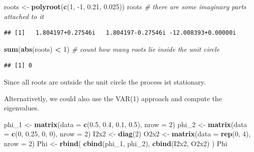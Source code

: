 \documentclass[12pt,a4paper]{article}
\newenvironment{Shaded}{\begin{snugshade}}{\end{snugshade}}
\newcommand{\CommentTok}[1]{\textcolor[rgb]{0.56,0.35,0.01}{\textit{#1}}}
\newcommand{\DataTypeTok}[1]{\textcolor[rgb]{0.13,0.29,0.53}{#1}}
\newcommand{\DecValTok}[1]{\textcolor[rgb]{0.00,0.00,0.81}{#1}}
\newcommand{\FloatTok}[1]{\textcolor[rgb]{0.00,0.00,0.81}{#1}}
\newcommand{\KeywordTok}[1]{\textcolor[rgb]{0.13,0.29,0.53}{\textbf{#1}}}
\newcommand{\NormalTok}[1]{#1}
\newcommand{\OperatorTok}[1]{\textcolor[rgb]{0.81,0.36,0.00}{\textbf{#1}}}
\newcommand{\StringTok}[1]{\textcolor[rgb]{0.31,0.60,0.02}{#1}}
\begin{document}
\begin{Shaded}
\begin{Highlighting}[]
\NormalTok{roots <-}\StringTok{ }\KeywordTok{polyroot}\NormalTok{(}\KeywordTok{c}\NormalTok{(}\DecValTok{1}\NormalTok{, }\DecValTok{-1}\NormalTok{, }\FloatTok{0.21}\NormalTok{, }\FloatTok{0.025}\NormalTok{))}
\NormalTok{roots }\CommentTok{# there are some imaginary parts attached to it}
\end{Highlighting}
\end{Shaded}

\begin{verbatim}
## [1]   1.804197+0.27546i   1.804197-0.27546i -12.008393+0.00000i
\end{verbatim}

\begin{Shaded}
\begin{Highlighting}[]
\KeywordTok{sum}\NormalTok{(}\KeywordTok{abs}\NormalTok{(roots) }\OperatorTok{<}\StringTok{ }\DecValTok{1}\NormalTok{) }\CommentTok{# count how many roots lie inside the unit circle}
\end{Highlighting}
\end{Shaded}

\begin{verbatim}
## [1] 0
\end{verbatim}

Since all roots are outside the unit circle the process ist stationary.

Alternativetly, we could also use the VAR(1) approach and compute the
eigenvalues.

\begin{Shaded}
\begin{Highlighting}[]
\NormalTok{phi_}\DecValTok{1}\NormalTok{ <-}\StringTok{ }\KeywordTok{matrix}\NormalTok{(}\DataTypeTok{data =} \KeywordTok{c}\NormalTok{(}\FloatTok{0.5}\NormalTok{, }\FloatTok{0.4}\NormalTok{, }\FloatTok{0.1}\NormalTok{, }\FloatTok{0.5}\NormalTok{), }\DataTypeTok{nrow =} \DecValTok{2}\NormalTok{)}
\NormalTok{phi_}\DecValTok{2}\NormalTok{ <-}\StringTok{ }\KeywordTok{matrix}\NormalTok{(}\DataTypeTok{data =} \KeywordTok{c}\NormalTok{(}\DecValTok{0}\NormalTok{, }\FloatTok{0.25}\NormalTok{, }\DecValTok{0}\NormalTok{, }\DecValTok{0}\NormalTok{), }\DataTypeTok{nrow =} \DecValTok{2}\NormalTok{)}
\NormalTok{I2x2 <-}\StringTok{ }\KeywordTok{diag}\NormalTok{(}\DecValTok{2}\NormalTok{)}
\NormalTok{O2x2 <-}\StringTok{ }\KeywordTok{matrix}\NormalTok{(}\DataTypeTok{data =} \KeywordTok{rep}\NormalTok{(}\DecValTok{0}\NormalTok{, }\DecValTok{4}\NormalTok{), }\DataTypeTok{nrow =} \DecValTok{2}\NormalTok{)}
\NormalTok{Phi <-}\StringTok{ }\KeywordTok{rbind}\NormalTok{( }\KeywordTok{cbind}\NormalTok{(phi_}\DecValTok{1}\NormalTok{, phi_}\DecValTok{2}\NormalTok{), }\KeywordTok{cbind}\NormalTok{(I2x2, O2x2) )}
\NormalTok{Phi}
\end{Highlighting}
\end{Shaded}
\end{document}
